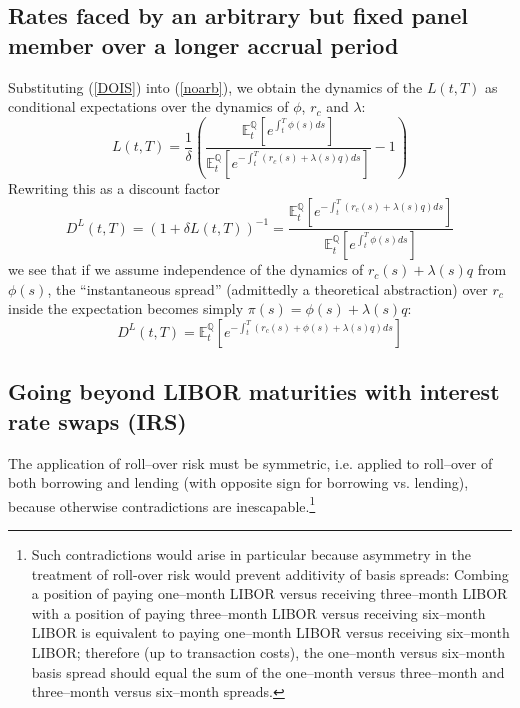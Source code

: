 \documentclass[12pt,a4paper]{article}
\theoremstyle{plain}
\numberwithin{equation}{section}
\begin{document}
\subsection{Rates faced by an arbitrary but fixed panel member over a longer accrual period}
Substituting (\ref{DOIS}) into (\ref{noarb}), we obtain the dynamics of the $L(t,T)$ as conditional expectations over the dynamics of $\phi$, $r_c$ and $\lambda$:
\begin{equation}
L(t,T)=\frac1{\delta}\left(\frac{\mathbb{E}_t^\mathbb{Q}\left[e^{\int_{t}^T\phi(s)ds}\right]}{\mathbb{E}_t^\mathbb{Q}\left[e^{-\int_{t}^T(r_c(s)+\lambda(s)q)ds}\right]}
-1\right)\label{libor}
\end{equation}
Rewriting this as a discount factor
\begin{equation}
D^L(t,T)=(1+\delta L(t,T))^{-1}= \frac{\mathbb{E}_t^\mathbb{Q}\left[e^{-\int_{t}^T(r_c(s)+\lambda(s)q)ds}\right]}{\mathbb{E}_t^\mathbb{Q}\left[e^{\int_{t}^T\phi(s)ds}\right]}
\label{Dlibor}
\end{equation}
we see that if we assume independence of the dynamics of $r_c(s)+\lambda(s)q$ from $\phi(s)$, the ``instantaneous spread'' (admittedly a theoretical abstraction) over $r_c$ inside the expectation becomes simply $\pi(s)=\phi(s)+\lambda(s)q$:
\begin{equation}
D^L(t,T)= \mathbb{E}_t^\mathbb{Q}\left[e^{-\int_{t}^T(r_c(s)+\phi(s)+\lambda(s)q)ds}\right]
\label{Dlibora}
\end{equation}

\subsection{Going beyond LIBOR maturities with interest rate swaps (IRS)}
The application of roll--over risk must be symmetric, i.e. applied to roll--over of both borrowing and lending (with opposite sign for borrowing vs. lending), because otherwise contradictions are inescapable.\footnote{Such contradictions would arise in particular because asymmetry in the treatment of roll-over risk would prevent additivity of basis spreads: Combing a position of paying one--month LIBOR versus receiving three--month LIBOR with a position of paying three--month LIBOR versus receiving six--month LIBOR is equivalent to paying one--month LIBOR versus receiving six--month LIBOR; therefore (up to transaction costs), the one--month versus six--month basis spread should equal the sum of the one--month versus three--month and three--month versus six--month spreads.}
\end{document}
